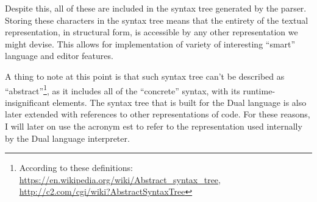 Despite this, all of these are included in the syntax tree generated by the
parser. Storing these characters in the syntax tree means that the entirety of
the textual representation, in structural form, is accessible by any other
representation we might devise. This allows for implementation of variety of
interesting ``smart'' language and editor features.

A thing to note at this point is that such syntax tree can't be described as
``abstract''\footnote{According to these definitions:
  \url{https://en.wikipedia.org/wiki/Abstract_syntax_tree},
  \url{http://c2.com/cgi/wiki?AbstractSyntaxTree}}, as it includes all of the
``concrete'' syntax, with its runtime-insignificant elements. The syntax tree
that is built for the Dual language is also later extended with references to
other representations of code. For these reasons, I will later on use the
acronym \acrlong{est} to refer to the representation used internally by the Dual
language interpreter.

